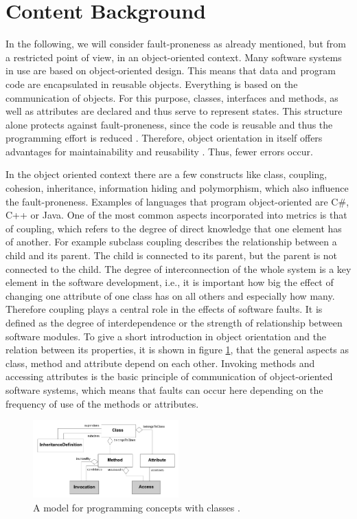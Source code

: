 \section{Content Background}\label{content}

In the following, we will consider fault-proneness as already mentioned, but from a restricted point of view, in an object-oriented context. Many software systems in use are based on object-oriented design. This means that data and program code are encapsulated in reusable objects. Everything is based on the communication of objects. For this purpose, classes, interfaces and methods, as well as attributes are declared and thus serve to represent states. This structure alone protects against fault-proneness, since the code is reusable and thus the programming effort is reduced \cite{fichman1993adoption}. Therefore, object orientation in itself offers advantages for maintainability and reusability \cite{lanza2002beyond}. Thus, fewer errors occur. 

In the object oriented context there are a few constructs like class, coupling, cohesion, inheritance, information hiding and polymorphism, which also influence the fault-proneness. Examples of languages that program object-oriented are C\#, C++ or Java.
One of the most common aspects incorporated into metrics is that of coupling, which refers to the degree of direct knowledge that one element has of another. For example subclass coupling describes the relationship between a child and its parent. The child is connected to its parent, but the parent is not connected to the child. The degree of interconnection of the whole system is a key element in the software development, i.e., it is important how big the effect of changing one attribute of one class has on all others and especially how many.
Therefore coupling plays a central role in the effects of software faults. It is defined as the degree of interdependence or the strength of relationship between software modules.
To give a short introduction in object orientation and the relation between its properties, it is shown in figure \ref{fig0}, that the general aspects as class, method and attribute depend on each other. Invoking methods and accessing attributes is the basic principle of communication of object-oriented software systems, which means that faults can occur here depending on the frequency of use of the methods or attributes.

\begin{figure}[htbp]
	\centerline{\includegraphics[width=0.5\textwidth]{pictures/oodesign.png}}
	\caption{A model for programming concepts with classes \cite{lanza2002beyond}.}
	\label{fig0}
\end{figure}

